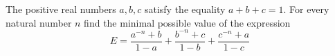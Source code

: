 The positive real numbers $a, b, c$ satisfy the equality $a + b + c = 1$. For every natural number $n$ find the minimal possible value of the expression $$E=\frac{a^{-n}+b}{1-a}+\frac{b^{-n}+c}{1-b}+\frac{c^{-n}+a}{1-c}$$